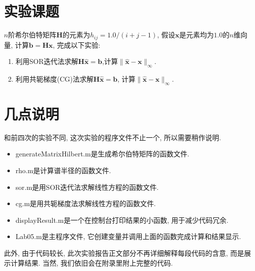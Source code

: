 \documentclass[a4paper,12pt]{article}
\begin{document}
\begin{CJK*}{UTF8}{gbsn}



\section{实验课题}
$n$阶希尔伯特矩阵$\bm{H}$的元素为$h_{ij}=1.0/(i+j-1)$, 假设$\bm{x}$是元素均为$1.0$的$n$维向量, 计算$\bm{b}=\bm{H}\bm{x}$, 完成以下实验:\par 
\begin{enumerate}
\item 利用SOR迭代法求解$\bm{H}\bm{\hat{x}}=\bm{b}$,计算$\|\bm{\hat{x}}-\bm{x}\|_\infty$.
\item 利用共轭梯度(CG)法求解$\bm{H}\bm{\hat{x}}=\bm{b}$, 计算$\|\bm{\hat{x}}-\bm{x}\|_\infty$.
\end{enumerate}

\section{几点说明}
和前四次的实验不同, 这次实验的程序文件不止一个, 所以需要稍作说明.
\begin{itemize}
\item generateMatrixHilbert.m是生成希尔伯特矩阵的函数文件.
\item rho.m是计算谱半径的函数文件.
\item sor.m是用SOR迭代法求解线性方程的函数文件.
\item cg.m是用共轭梯度法求解线性方程的函数文件.
\item displayResult.m是一个在控制台打印结果的小函数, 用于减少代码冗余.
\item Lab05.m是主程序文件, 它创建变量并调用上面的函数完成计算和结果显示.
\end{itemize}\par
此外, 由于代码较长, 此次实验报告正文部分不再详细解释每段代码的含意, 而是展示计算结果. 当然, 我们依旧会在附录里附上完整的代码.

\end{CJK*}
\end{document}
